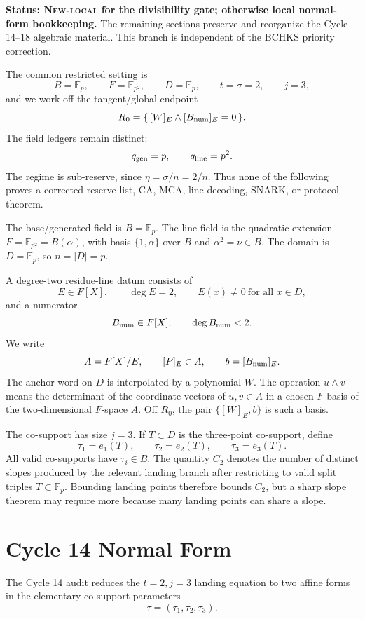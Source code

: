 \documentclass[11pt]{article}
\newcommand{\F}{\mathbb F}
\newcommand{\Bnum}{B_{\rm num}}
\newcommand{\tauone}{\tau_1}
\newcommand{\tautwo}{\tau_2}
\newcommand{\tauthree}{\tau_3}
\newcommand{\Ctwo}{C_2}
\newcommand{\qline}{q_{\rm line}}
\newcommand{\qgen}{q_{\rm gen}}
\begin{document}
\textbf{Status: \textsc{New-local} for the divisibility gate; otherwise local
normal-form bookkeeping.}
The remaining sections preserve and reorganize the Cycle 14--18 algebraic
material.  This branch is independent of the BCHKS priority correction.

The common restricted setting is
\[
  B=\F_p,\qquad F=\F_{p^2},\qquad D=\F_p,\qquad
  t=\sigma=2,\qquad j=3,
\]
and we work off the tangent/global endpoint
\[
  R_0=\{\, [W]_E\wedge [\Bnum]_E=0\,\}.
\]
The field ledgers remain distinct:
\[
  \qgen=p,\qquad \qline=p^2.
\]
The regime is sub-reserve, since \(\eta=\sigma/n=2/n\).  Thus none of the
following proves a corrected-reserve list, CA, MCA, line-decoding, SNARK, or
protocol theorem.

The base/generated field is \(B=\F_p\).  The line field is the quadratic
extension \(F=\F_{p^2}=B(\alpha)\), with basis \(\{1,\alpha\}\) over \(B\) and
\(\alpha^2=\nu\in B\).  The domain is \(D=\F_p\), so \(n=|D|=p\).

A degree-two residue-line datum consists of
\[
  E\in F[X],\qquad \deg E=2,
  \qquad E(x)\ne0\ \text{for all }x\in D,
\]
and a numerator
\[
  \Bnum\in F[X],\qquad \deg \Bnum<2.
\]
We write
\[
  A=F[X]/E,
  \qquad [P]_E\in A,
  \qquad b=[\Bnum]_E.
\]
The anchor word on \(D\) is interpolated by a polynomial \(W\).  The operation
\(u\wedge v\) means the determinant of the coordinate vectors of \(u,v\in A\)
in a chosen \(F\)-basis of the two-dimensional \(F\)-space \(A\).  Off \(R_0\),
the pair \(\{[W]_E,b\}\) is such a basis.

The co-support has size \(j=3\).  If \(T\subset D\) is the three-point
co-support, define
\[
  \tau_1=e_1(T),\qquad \tau_2=e_2(T),\qquad \tau_3=e_3(T).
\]
All valid co-supports have \(\tau_i\in B\).  The quantity \(\Ctwo\) denotes the
number of distinct slopes produced by the relevant landing branch after
restricting to valid split triples \(T\subset\F_p\).  Bounding landing points
therefore bounds \(\Ctwo\), but a sharp slope theorem may require more because
many landing points can share a slope.

\section{Cycle 14 Normal Form}
\label{sec:cycle14}

The Cycle 14 audit reduces the \(t=2,j=3\) landing equation to two affine forms
in the elementary co-support parameters
\[
  \tau=(\tauone,\tautwo,\tauthree).
\]
\end{document}
